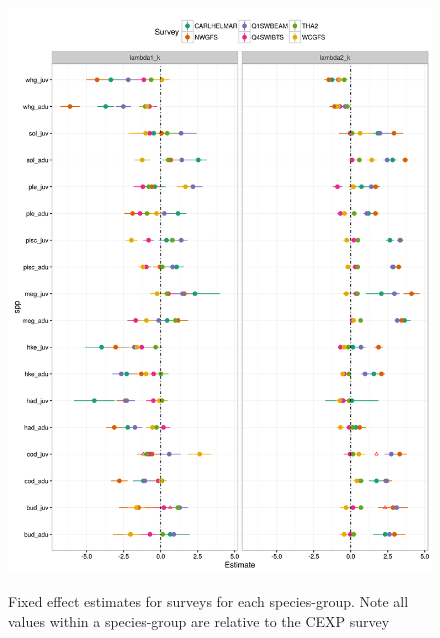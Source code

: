 \documentclass[12pt]{article}
\begin{document}
\begin{linenumbers}
\begin{figure}[!ht]
\begin{center}
	\includegraphics[width = 0.85\linewidth]{"../figures/Suppl - QEstimatesALL"}
	\label{fig:S11}
	\caption{Fixed effect estimates for surveys for each species-group. Note
	all values within a species-group are relative to the CEXP survey}
	\end{center}
\end{figure}


\end{linenumbers}
\end{document}
